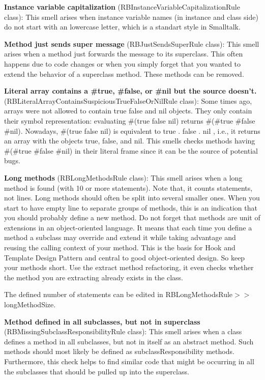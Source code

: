 \textbf{Instance variable capitalization} (RBInstanceVariableCapitalizationRule class): This smell arises when instance variable names (in instance and class side) do not start with an lowercase letter, which is a standart style in Smalltalk.

\textbf{Method just sends super message} (RBJustSendsSuperRule class): This smell arises when a method just forwards the message to its superclass. This often happens due to code changes or when you simply forget that you wanted to extend the behavior of a superclass method. These methods can be removed.

\textbf{Literal array contains a #true, #false, or #nil but the source doesn't.} (RBLiteralArrayContainsSuspiciousTrueFalseOrNilRule class): Some times ago, arrays were not allowed to contain true false and nil objects. They only contain their symbol representation: evaluating \#(true false nil) returns \#(\#true \#false \#nil). 
	Nowadays, \#(true false nil) is equivalent to {true . false . nil }, i.e., it returns an array with the objects true, false, and nil. 
	This smells checks methods having \#(\#true \#false \#nil) in their literal frame since it can be the source of potential bugs. 
	 

\textbf{Long methods} (RBLongMethodsRule class): This smell arises when a long method is found (with 10 or more statements). Note that, it counts statements, not lines. Long methods should often be split into several smaller ones. When you start to have empty line to separate groups of methods, this is an indication that you should probably define a new method. 
	Do not forget that methods are unit of extensions in an object-oriented language. It means that each time you define a method a subclass may override and extend it while taking advantage and reusing the calling context of your method. This is the basis for Hook and Template Design Pattern and central to good object-oriented design. So keep your methods short. 
	Use the extract method refactoring, it even checks whether the method you are extracting already exists in the class. 
	
	The defined number of statements can be edited in RBLongMethodsRule$>>$longMethodSize.

\textbf{Method defined in all subclasses, but not in superclass} (RBMissingSubclassResponsibilityRule class): This smell arises when a class defines a method in all subclasses, but not in itself as an abstract method. Such methods should most likely be defined as subclassResponsibility methods. Furthermore, this check helps to find similar code that might be occurring in all the subclasses that should be pulled up into the superclass.

